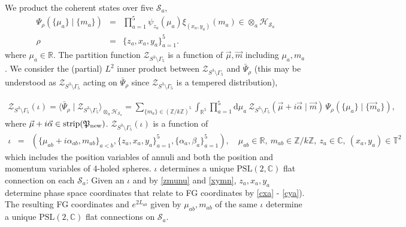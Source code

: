 \documentclass[aps,prd,notitlepage,nofootinbib,superscriptaddress,groupedaddress,twocolumn]{revtex4-1}
\def\C{\mathbb{C}}
\def\R{\mathbb{R}}
\newcommand{\PSlc}{\mathrm{PSL}(2,\mathbb{C})}
\def\be{\begin{eqnarray}}
\def\ee{\end{eqnarray}}
\newcommand{\ch}{\mathcal H}
\newcommand{\cs}{\mathcal S}
\newcommand{\cz}{\mathcal Z}
\renewcommand{\a}{\alpha}
\renewcommand{\b}{\beta}
\newcommand{\G}{\Gamma}
\newcommand{\rmd}{\mathrm d}
\newcommand{\lt}{\left}
\newcommand{\rt}{\right}
\begin{document}
We product the coherent states over five $\cs_a$, 
\be
\Psi_\rho\lt(\{{\mu}_a\}\mid\{{m}_a\}\rt)
&=&%
\prod_{a=1}^5\psi_{z_a}(\mu_a)\xi_{(x_a,y_a)}(m_a)\in \otimes_a\ch_{\cs_a}\nonumber\\
\rho&=&\{z_a,x_a,y_a\}_{a=1}^5.
\ee
where $\mu_a\in\R$. The partition function $\cz_{S^3\setminus\G_5}$ is a function of $\vec{\mu},\vec{m}$ including $\mu_a,m_a$. We consider the (partial) $L^2$ inner product between $\cz_{S^3\setminus\G_5}$ and $\bar{\Psi}_\rho$ (this may be understood as $\cz_{S^3\setminus\G_5}$ acting on $\bar{\Psi}_\rho$ since $\cz_{S^3\setminus\G_5}$ is a tempered distribution),
\begin{widetext}
\be
\cz_{S^3\setminus\G_5}(\iota)=\langle \bar{\Psi}_\rho\mid \cz_{S^3\setminus\G_5}\rangle_{\otimes_a\ch_{\cs_a}}=\sum_{\{{m}_a\}\in(\mathbb{Z}/k\mathbb{Z})^{5}}\int_{\R^{5}}\prod_{a=1}^5\rmd \mu_a\ \cz_{S^3\setminus\G_5}(\vec{\mu}+i\vec{\a}\mid \vec{m})\,\Psi_\rho\lt(\{{\mu}_a\}\mid\{\vec{m}_a\}\rt),\label{Zsigma1}
\ee
where $\vec{\mu}+i\vec{\a}\in\mathrm{strip}(\Fp_{\rm new})$. %
$\cz_{S^3\setminus\G_5}(\iota)$ is a function of
\be
\iota&=&\lt(\{\mu_{ab}+i \a_{ab},m_{ab}\}_{a<b},\{z_a,x_a,y_a\}_{a=1}^5,\{\a_a,\b_a\}_{a=1}^5\rt),\quad \mu_{ab}\in\R,\ m_{ab}\in\mathbb{Z}/k\mathbb{Z},\ z_a\in\C,\ (x_a,y_a)\in\mathbb{T}^2\label{sigmalabel}
\ee
which includes the position variables of annuli and both the position and momentum variables of 4-holed spheres. $\iota$ determines a unique $\PSlc$ flat connection on each $\cs_a$: Given an $\iota$ and by \eqref{zmunu} and \eqref{xymn}, $z_a,x_a,y_a$ determine phase space coordinates that relate to FG coordinates by \eqref{cxa} - \eqref{cya}). The resulting FG coordinates and $e^{2L_{ab}}$ given by $\mu_{ab},m_{ab}$ of the same $\iota$ determine a unique $\PSlc$ flat connections on $\cs_a$.






\end{widetext}
\end{document}
